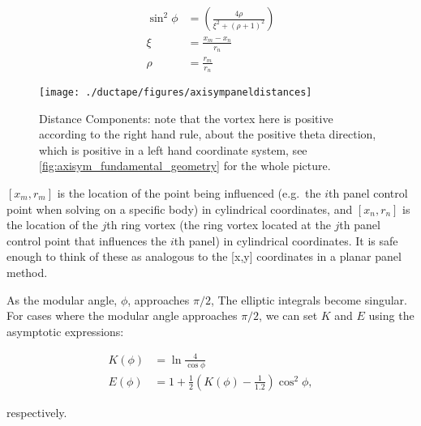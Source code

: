 \begin{equation}
	\label{eqn:normalizedgeom}
	\begin{aligned}
		\sin^2 \phi &= \left( \frac{4\rho}{\xi^2 + (\rho+1)^2} \right) \\%
		\xi &= \frac{x_m - x_n}{r_n} \\
		\rho &= \frac{r_m}{r_n}
	\end{aligned}
\end{equation}

\begin{figure}[h!]
	\centering
	\texttt{[image: ./ductape/figures/axisympaneldistances]}
	\caption{Distance Components: note that the vortex here is positive according to the right hand rule, about the positive theta direction, which is positive in a left hand coordinate system, see \cref{fig:axisym_fundamental_geometry} for the whole picture.}
	\label{fig:axisym_panel_distances}
\end{figure}

\where \([x_m, r_m]\) is the location of the point being influenced (e.g.~the \(i\)th panel control point when solving on a specific body) in cylindrical coordinates, and \([x_n,r_n]\) is the location of the \(j\)th ring vortex (the ring vortex located at the \(j\)th panel control point that influences the \(i\)th panel) in cylindrical coordinates.
It is safe enough to think of these as analogous to the [x,y] coordinates in a planar panel method.


As the modular angle, \(\phi\), approaches \(\pi/2\), The elliptic integrals become singular.
For cases where the modular angle approaches \(\pi/2\), we can set \(K\) and \(E\) using the asymptotic expressions:%

\begin{equation}
	\begin{aligned}
		K(\phi) &= \ln \frac{4}{\cos \phi} \\
		E(\phi) &= 1 + \frac{1}{2} \left( K(\phi) - \frac{1}{1.2}\right) \cos^2 \phi,
	\end{aligned}
\end{equation}

\noindent respectively.

%
%


